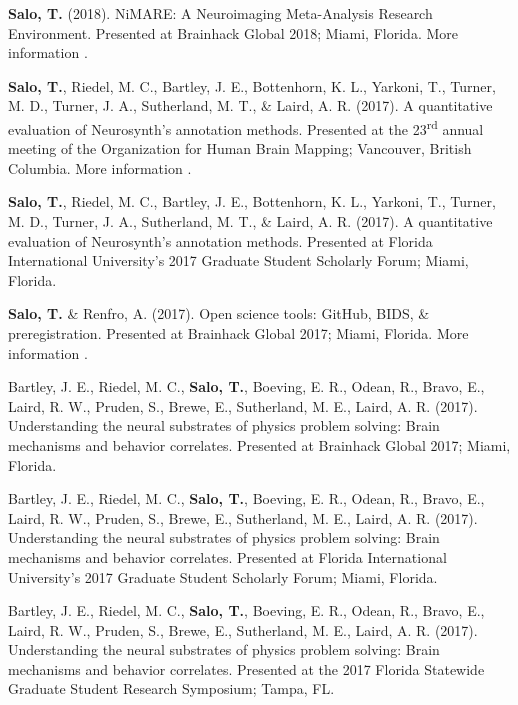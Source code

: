 \documentclass[10pt]{article}
\newcommand{\textlink}[3][blue]{\href{#2}{\color{#1}{#3}}}
\begin{document}
\begin{hangparas}{.25in}{1}
\textbf{Salo, T.} (2018).
NiMARE: A Neuroimaging Meta-Analysis Research Environment.
Presented at Brainhack Global 2018; Miami, Florida. More
information \textlink{https://www.slideshare.net/TaylorSalo/nimarebrainhackglobalmiami}{here}.

\bigskip

\textbf{Salo, T.}, Riedel, M. C., Bartley, J. E., Bottenhorn, K. L., Yarkoni, T.,
Turner, M. D., Turner, J. A., Sutherland, M. T., \& Laird, A. R. (2017).
A quantitative evaluation of Neurosynth's annotation methods. Presented at
the 23\textsuperscript{rd} annual meeting of the Organization for Human Brain
Mapping; Vancouver, British Columbia. More information
\textlink{https://nbclab.github.io/presentations/salo-neurosynth-presentation}{here}.

\bigskip

\textbf{Salo, T.}, Riedel, M. C., Bartley, J. E., Bottenhorn, K. L., Yarkoni, T.,
Turner, M. D., Turner, J. A., Sutherland, M. T., \& Laird, A. R. (2017).
A quantitative evaluation of Neurosynth's annotation methods. Presented at
Florida International University's 2017 Graduate Student Scholarly Forum;
Miami, Florida.

\bigskip

\textbf{Salo, T.} \& Renfro, A. (2017). Open science tools: GitHub, BIDS, \&
preregistration. Presented at Brainhack Global 2017; Miami, Florida. More
information \textlink{https://osf.io/557vf}{here}.

\bigskip

Bartley, J. E., Riedel, M. C., \textbf{Salo, T.}, Boeving, E. R., Odean, R.,
Bravo, E., Laird, R. W., Pruden, S., Brewe, E., Sutherland, M. E., Laird, A. R.
(2017). Understanding the neural substrates of physics problem solving: Brain
mechanisms and behavior correlates. Presented at Brainhack Global 2017; Miami,
Florida.

\bigskip

Bartley, J. E., Riedel, M. C., \textbf{Salo, T.}, Boeving, E. R., Odean, R.,
Bravo, E., Laird, R. W., Pruden, S., Brewe, E., Sutherland, M. E., Laird, A. R.
(2017). Understanding the neural substrates of physics problem solving: Brain
mechanisms and behavior correlates. Presented at Florida International
University's 2017 Graduate Student Scholarly Forum; Miami, Florida.

\bigskip

Bartley, J. E., Riedel, M. C., \textbf{Salo, T.}, Boeving, E. R., Odean, R.,
Bravo, E., Laird, R. W., Pruden, S., Brewe, E., Sutherland, M. E., Laird, A. R.
(2017). Understanding the neural substrates of physics problem solving: Brain
mechanisms and behavior correlates. Presented at the 2017 Florida Statewide
Graduate Student Research Symposium; Tampa, FL.
\end{hangparas}
\end{document}

